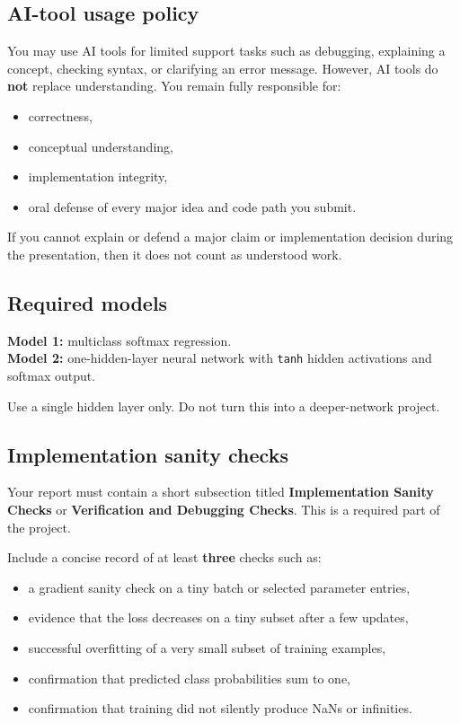 \documentclass[11pt]{article}
\begin{document}
\subsection{AI-tool usage policy}

You may use AI tools for limited support tasks such as debugging, explaining a concept, checking syntax, or clarifying an error message. However, AI tools do \textbf{not} replace understanding. You remain fully responsible for:

\begin{itemize}
    \item correctness,
    \item conceptual understanding,
    \item implementation integrity,
    \item oral defense of every major idea and code path you submit.
\end{itemize}

If you cannot explain or defend a major claim or implementation decision during the presentation, then it does not count as understood work.

\subsection{Required models}

\textbf{Model 1:} multiclass softmax regression. \\
\textbf{Model 2:} one-hidden-layer neural network with \verb|tanh| hidden activations and softmax output.

Use a single hidden layer only. Do not turn this into a deeper-network project.

\subsection{Implementation sanity checks}

Your report must contain a short subsection titled \textbf{Implementation Sanity Checks} or \textbf{Verification and Debugging Checks}. This is a required part of the project.

Include a concise record of at least \textbf{three} checks such as:

\begin{itemize}
    \item a gradient sanity check on a tiny batch or selected parameter entries,
    \item evidence that the loss decreases on a tiny subset after a few updates,
    \item successful overfitting of a very small subset of training examples,
    \item confirmation that predicted class probabilities sum to one,
    \item confirmation that training did not silently produce NaNs or infinities.
\end{itemize}
\end{document}
